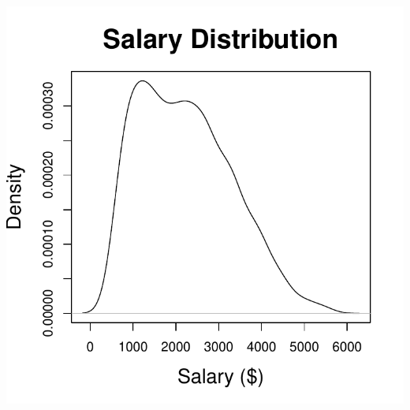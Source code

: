 \documentclass[aspectratio=169]{beamer}
\theoremstyle{principle}
\begin{document}
\begin{frame}
\begin{columns}
\begin{column}{0.5\textwidth}
\includegraphics[scale=0.5]{salary_distribution.pdf}
\end{column}

\end{columns}

\end{frame}
\end{document}
